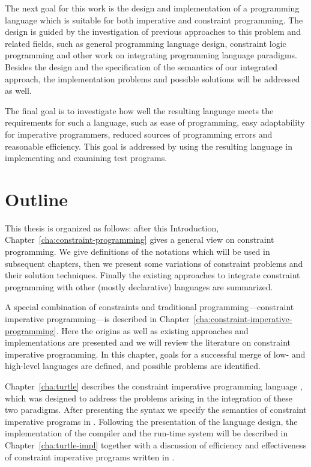 The next goal for this work is the design and implementation of a
programming language which is suitable for both imperative and
constraint programming.  The design is guided by the investigation of
previous approaches to this problem and related fields, such as
general programming language design, constraint logic programming and
other work on integrating programming language paradigms.  Besides the
design and the specification of the semantics of our integrated
approach, the implementation problems and possible solutions will be
addressed as well.

The final goal is to investigate how well the resulting language meets
the requirements for such a language, such as ease of programming,
easy adaptability for imperative programmers, reduced sources of
programming errors and reasonable efficiency.  This goal is addressed
by using the resulting language in implementing and examining test
programs.


\section{Outline}
\label{sec:outline}

This thesis is organized as follows: after this Introduction,
Chapter~\ref{cha:constraint-programming} gives a general view on
constraint programming.  We give definitions of the notations which
will be used in subsequent chapters, then we present some variations
of constraint problems and their solution techniques.  Finally the
existing approaches to integrate constraint programming with other
(mostly declarative) languages are summarized.

A special combination of constraints and traditional
programming---constraint im\-pe\-ra\-tive programming---is described
in Chapter~\ref{cha:constraint-imperative-programming}. Here the
origins as well as existing approaches and implementations are
presented and we will review the literature on constraint
im\-pe\-ra\-tive programming.  In this chapter, goals for a successful
merge of low- and high-level languages are defined, and possible
problems are identified.

Chapter~\ref{cha:turtle} describes the constraint imperative
programming language \turtle{}, which was designed to address the
problems arising in the integration of these two paradigms.  After
presenting the syntax we specify the semantics of constraint
imperative programs in \turtle{}.  Following the presentation of the
language design, the implementation of the compiler and the run-time
system will be described in Chapter~\ref{cha:turtle-impl} together
with a discussion of efficiency and effectiveness of constraint
imperative programs written in \turtle{}.

